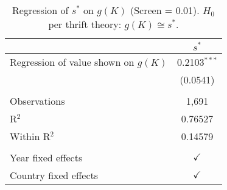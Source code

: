 \begin{table}[pos=h]
\caption{Regression of \(s^*\) on \(g(K)\) (Screen = 0.01). \(H_0\) per thrift theory: \(g(K) \cong s^*\).}
\centering
\begin{tabularx}{\columnwidth}{lc}
   \toprule
                                           & $s^*$         \\ 
   \midrule 
   Regression of value shown on \(g(K)\)   & 0.2103$^{***}$\\ 
                                           & (0.0541)   \\    
    \\
   Observations                            & 1,691   \\       
   R$^2$                                   & 0.76527  \\      
   Within R$^2$                            & 0.14579   \\     
    \\
   Year fixed effects                      & $\checkmark$ \\ 
   Country fixed effects                   & $\checkmark$ \\ 
   \bottomrule
\end{tabularx}
   \label{tbl-4}
\end{table}
